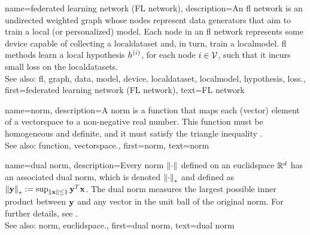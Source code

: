 {name={federated learning network (FL network)},
	description={An \gls{fl} network is an 
		undirected weighted \gls{graph} whose nodes represent \gls{data} generators that 
		aim to train a local (or personalized) \gls{model}. Each node in an \gls{fl} network 
		represents some \gls{device} capable of collecting a \gls{localdataset} 
		and, in turn, train a \gls{localmodel}. \Gls{fl} methods learn a local \gls{hypothesis} $h^{(i)}$, for 
	    	each node $i \in \mathcal{V}$, such that it incurs small \gls{loss} on the \glspl{localdataset}.
	    			\\ 
		See also: \gls{fl}, \gls{graph}, \gls{data}, \gls{model}, \gls{device}, \gls{localdataset}, \gls{localmodel}, \gls{hypothesis}, \gls{loss}.},
	first={federated learning network (FL network)},
	text={FL network} 
}

{name={norm},
	description={A norm is a \gls{function} that maps each (vector) element 
		of a \gls{vectorspace} to a non-negative real number. This \gls{function} must be 
		homogeneous and definite, and it must satisfy the triangle inequality \cite{HornMatAnalysis}.
		\\
		See also: \gls{function}, \gls{vectorspace}.},
	first={norm},
	text={norm} 
}

{name={dual norm},
	description={Every \gls{norm} $\left\Vert {\cdot} \right\Vert_{}$ defined on an \gls{euclidspace} $\mathbb{R}^{d}$ 
		has an associated dual \gls{norm}, which is denoted $\left\Vert {\cdot} \right\Vert_{*}$ and defined as 
		$\left\Vert {{\bf y}} \right\Vert_{*} := \sup_{\Vert {{\bf x}} \Vert{} \le 1} {\bf y}^{T} {\bf x}$. 
		The dual \gls{norm} measures the largest possible inner product between ${\bf y}$ 
		and any vector in the unit ball of the original \gls{norm}. For further details, see 
		\cite[Sec.~A.1.6]{BoydConvexBook}.
					\\ 
		See also: \gls{norm}, \gls{euclidspace}.},
	first={dual norm},
	text={dual norm}
}

